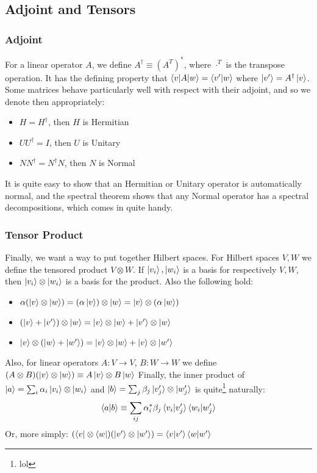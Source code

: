 \documentclass{beamer}
\begin{document}
    \subsection{Adjoint and Tensors}
    \begin{frame}
        \frametitle{Adjoint}
        For a linear operator $A$, we define $A^\dagger \equiv (A^T)^*$, where $\cdot^T$ is the transpose operation.
        It has the defining property that $\braket{v|A|w} = \braket{v'|w}$ where $\ket{v'} = A^\dagger \ket{v}$.
        Some matrices behave particularly well with respect with their adjoint, and so we denote then appropriately:
        \begin{itemize}
            \item $H = H^\dagger$, then $H$ is Hermitian
            \item $UU^\dagger = I$, then $U$ is Unitary 
            \item $N N^\dagger = N^\dagger N$, then $N$ is Normal 
        \end{itemize}
        It is quite easy to show that an Hermitian or Unitary operator is automatically normal, and 
        the spectral theorem shows that any Normal operator has a spectral decompositions, which comes in quite handy.
    \end{frame}
    \begin{frame}
        \frametitle{Tensor Product}
        Finally, we want a way to put together Hilbert spaces. For Hilbert spaces $V, W$ we define the tensored product $V \otimes W$.
        If $\ket{v_i}, \ket{w_i}$ is a basis for respectively $V, W$, then $\ket{v_i} \otimes \ket{w_i}$ is a basis for the product.
        Also the following hold:
        \begin{itemize}
            \item $\alpha (\ket{v}\otimes\ket{w}) = (\alpha \ket{v})\otimes\ket{w} = \ket{v}\otimes (\alpha \ket{w})$
            \item $(\ket{v} + \ket{v'}) \otimes\ket{w} = \ket{v} \otimes \ket{w} + \ket{v'} \otimes \ket{w}$
            \item $\ket{v} \otimes (\ket{w} + \ket{w'}) = \ket{v} \otimes \ket{w} + \ket{v} \otimes \ket{w'}$
        \end{itemize}
        Also, for linear operators $A: V \to V$, $B: W \to W$ we define $(A \otimes B) (\ket{v} \otimes \ket{w}) \equiv A \ket{v} \otimes B \ket{w}$
        Finally, the inner product of $\ket{a} = \sum_i \alpha_i \ket{v_i} \otimes \ket{w_i}$ and $\ket{b} = \sum_j \beta_j \ket{v_j'} \otimes \ket{w_j'}$ is quite\footnote{lol} naturally:
        \begin{equation}
            \braket{a|b} \equiv \sum_{ij} \alpha_i^* \beta_j \braket{v_i|v_j'} \braket{w_i|w_j'} 
        \end{equation}
        Or, more simply: $(\bra{v} \otimes \bra{w})(\ket{v'} \otimes \ket{w'}) = \braket{v|v'} \braket{w|w'}$
    \end{frame}
\end{document}
